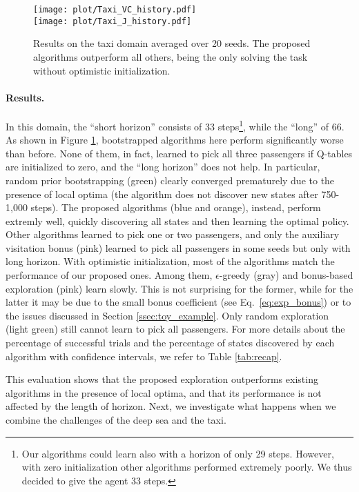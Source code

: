 \documentclass{article}
\begin{document}
\begin{figure}[t]
	\centering
	\texttt{[image: plot/Taxi\_VC\_history.pdf]}\\
	\texttt{[image: plot/Taxi\_J\_history.pdf]}
	\caption{\label{fig:taxi_res}Results on the taxi domain averaged over 20 seeds. The proposed algorithms outperform all others, being the only solving the task without optimistic initialization.}
\end{figure}

\paragraph{Results.}
In this domain, the ``short horizon'' consists of 33 steps\footnote{Our algorithms could learn also with a horizon of only 29 steps. However, with zero initialization other algorithms performed extremely poorly. We thus decided to give the agent 33 steps.}, while the ``long'' of 66.
As shown in Figure \ref{fig:taxi_res}, bootstrapped algorithms here perform significantly worse than before. None of them, in fact, learned to pick all three passengers if Q-tables are initialized to zero, and the ``long horizon'' does not help. In particular, random prior bootstrapping (green) clearly converged prematurely due to the presence of local optima (the algorithm does not discover new states after 750-1,000 steps).
The proposed algorithms (blue and orange), instead, perform extremly well, quickly discovering all states and then learning the optimal policy. Other algorithms learned to pick one or two passengers, and only the auxiliary visitation bonus (pink) learned to pick all passengers in some seeds but only with long horizon. 
With optimistic initialization, most of the algorithms match the performance of our proposed ones. Among them, $\epsilon$-greedy (gray) and bonus-based exploration (pink) learn slowly. This is not surprising for the former, while for the latter it may be due to the small bonus coefficient (see Eq.~\eqref{eq:exp_bonus}) or to the issues discussed in Section \ref{ssec:toy_example}.
Only random exploration (light green) still cannot learn to pick all passengers. For more details about the percentage of successful trials and the percentage of states discovered by each algorithm with confidence intervals, we refer to Table \ref{tab:recap}.

This evaluation shows that the proposed exploration outperforms existing algorithms in the presence of local optima, and that its performance is not affected by the length of horizon. Next, we investigate what happens when we combine the challenges of the deep sea and the taxi. 
\end{document}
